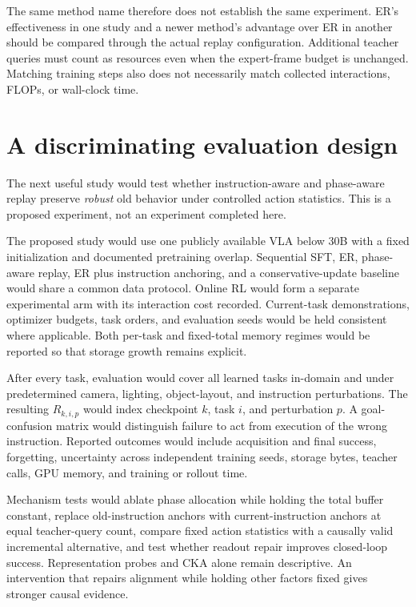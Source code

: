 \documentclass[11pt,a4paper]{article}
\begin{document}
The same method name therefore does not establish the same experiment. ER's effectiveness in one study and a newer method's advantage over ER in another should be compared through the actual replay configuration. Additional teacher queries must count as resources even when the expert-frame budget is unchanged. Matching training steps also does not necessarily match collected interactions, FLOPs, or wall-clock time.

\section{A discriminating evaluation design}
The next useful study would test whether instruction-aware and phase-aware replay preserve \emph{robust} old behavior under controlled action statistics. This is a proposed experiment, not an experiment completed here.

The proposed study would use one publicly available VLA below 30B with a fixed initialization and documented pretraining overlap. Sequential SFT, ER, phase-aware replay, ER plus instruction anchoring, and a conservative-update baseline would share a common data protocol. Online RL would form a separate experimental arm with its interaction cost recorded. Current-task demonstrations, optimizer budgets, task orders, and evaluation seeds would be held consistent where applicable. Both per-task and fixed-total memory regimes would be reported so that storage growth remains explicit.

After every task, evaluation would cover all learned tasks in-domain and under predetermined camera, lighting, object-layout, and instruction perturbations. The resulting $R_{k,i,p}$ would index checkpoint $k$, task $i$, and perturbation $p$. A goal-confusion matrix would distinguish failure to act from execution of the wrong instruction. Reported outcomes would include acquisition and final success, forgetting, uncertainty across independent training seeds, storage bytes, teacher calls, GPU memory, and training or rollout time.

Mechanism tests would ablate phase allocation while holding the total buffer constant, replace old-instruction anchors with current-instruction anchors at equal teacher-query count, compare fixed action statistics with a causally valid incremental alternative, and test whether readout repair improves closed-loop success. Representation probes and CKA alone remain descriptive. An intervention that repairs alignment while holding other factors fixed gives stronger causal evidence.
\end{document}

